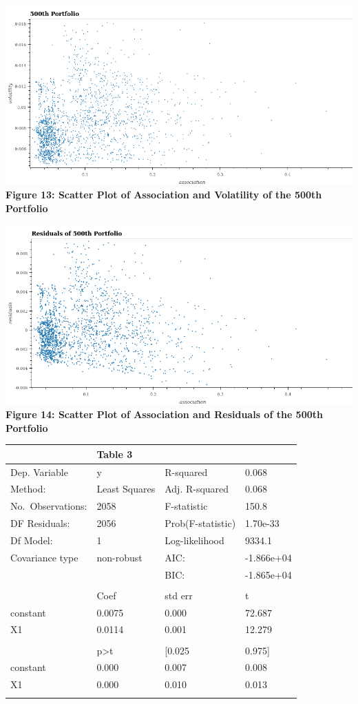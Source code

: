 \documentclass[11pt]{article}
\makeatletter
\def\maxwidth{\ifdim\Gin@nat@width>\linewidth\linewidth
    \else\Gin@nat@width\fi}
\let\Oldincludegraphics\includegraphics
\renewcommand{\includegraphics}[1]{\Oldincludegraphics[width=.8\maxwidth]{#1}}
\makeatother
\begin{document}
\includegraphics{../experiments/media/Scatter Plot of 500th Portofolio.png}\\

\textbf{Figure 13: Scatter Plot of Association and Volatility of the
500th Portfolio}

\includegraphics{../experiments/media/Scatter Plot of Residuals of 500th Portofolio.png}\\

\textbf{Figure 14: Scatter Plot of Association and Residuals of the
500th Portfolio}

\newpage

\begin{longtable}[]{@{}llll@{}}
\toprule
& \textbf{Table 3} & &\tabularnewline
\midrule
\endhead
Dep. Variable & y & R-squared & 0.068\tabularnewline
Method: & Least Squares & Adj. R-squared & 0.068\tabularnewline
No.~Observations: & 2058 & F-statistic & 150.8\tabularnewline
DF Residuals: & 2056 & Prob(F-statistic) & 1.70e-33\tabularnewline
Df Model: & 1 & Log-likelihood & 9334.1\tabularnewline
Covariance type & non-robust & AIC: & -1.866e+04\tabularnewline
& & BIC: & -1.865e+04\tabularnewline
& & &\tabularnewline
& Coef & std err & t\tabularnewline
constant & 0.0075 & 0.000 & 72.687\tabularnewline
X1 & 0.0114 & 0.001 & 12.279\tabularnewline
& & &\tabularnewline
& p\textgreater{}\textbar{}t\textbar{} & {[}0.025 &
0.975{]}\tabularnewline
constant & 0.000 & 0.007 & 0.008\tabularnewline
X1 & 0.000 & 0.010 & 0.013\tabularnewline
& & &\tabularnewline
\bottomrule
\end{longtable}
\end{document}
